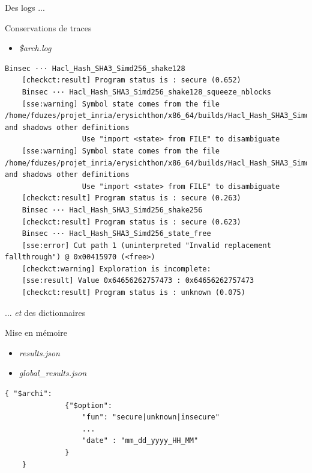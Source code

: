 \documentclass[A4,svgnames,9pt,aspectratio=169]{beamer}
\begin{document}
\begin{frame}[fragile]{Des logs ...}

  \begin{block}{Conservations de traces}
    \begin{itemize}
      \item \textit{\$arch.log}
    \end{itemize}
  \end{block}
  
  \begin{lstlisting}[style=global2, caption={x86\_64.log}, gobble=4]
    Binsec ··· Hacl_Hash_SHA3_Simd256_shake128
    [checkct:result] Program status is : secure (0.652)
    Binsec ··· Hacl_Hash_SHA3_Simd256_shake128_squeeze_nblocks
    [sse:warning] Symbol state comes from the file /home/fduzes/projet_inria/erysichthon/x86_64/builds/Hacl_Hash_SHA3_Simd256_shake128_squeeze_nblocks.exe and shadows other definitions
                  Use "import <state> from FILE" to disambiguate
    [sse:warning] Symbol state comes from the file /home/fduzes/projet_inria/erysichthon/x86_64/builds/Hacl_Hash_SHA3_Simd256_shake128_squeeze_nblocks.exe and shadows other definitions
                  Use "import <state> from FILE" to disambiguate
    [checkct:result] Program status is : secure (0.263)
    Binsec ··· Hacl_Hash_SHA3_Simd256_shake256
    [checkct:result] Program status is : secure (0.623)
    Binsec ··· Hacl_Hash_SHA3_Simd256_state_free
    [sse:error] Cut path 1 (uninterpreted "Invalid replacement fallthrough") @ 0x00415970 (<free>)
    [checkct:warning] Exploration is incomplete:
    [sse:result] Value 0x64656262757473 : 0x64656262757473
    [checkct:result] Program status is : unknown (0.075)
  \end{lstlisting}

\end{frame}


\begin{frame}[fragile]{... \textit{et} des dictionnaires}
  
  \begin{block}{Mise en mémoire}
    \begin{itemize}
      \item \textit{results.json}
      \item \textit{global\_results.json}
    \end{itemize}
  \end{block}

  \begin{lstlisting}[style=global2, caption={global\_results.json}, gobble=4]
    { "$archi":
              {"$option":
                  "fun": "secure|unknown|insecure"
                  ...
                  "date" : "mm_dd_yyyy_HH_MM"
              }
    }
  \end{lstlisting}

\end{frame}
\end{document}
